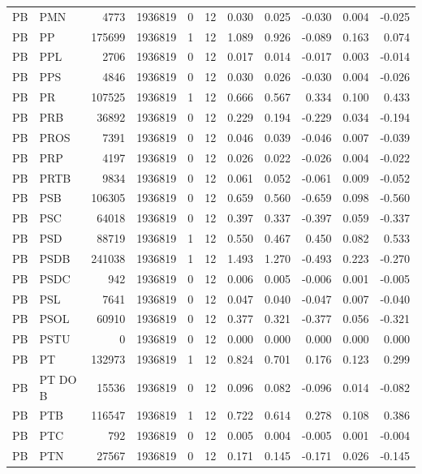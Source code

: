 \begin{landscape}
\begin{longtable}{llrrrrrrrrr}
PB & PMN & 4773 & 1936819 & 0 & 12 & 0.030 & 0.025 & -0.030 & 0.004 & -0.025 \\
PB & PP & 175699 & 1936819 & 1 & 12 & 1.089 & 0.926 & -0.089 & 0.163 & 0.074 \\
PB & PPL & 2706 & 1936819 & 0 & 12 & 0.017 & 0.014 & -0.017 & 0.003 & -0.014 \\
PB & PPS & 4846 & 1936819 & 0 & 12 & 0.030 & 0.026 & -0.030 & 0.004 & -0.026 \\
PB & PR & 107525 & 1936819 & 1 & 12 & 0.666 & 0.567 & 0.334 & 0.100 & 0.433 \\
PB & PRB & 36892 & 1936819 & 0 & 12 & 0.229 & 0.194 & -0.229 & 0.034 & -0.194 \\
PB & PROS & 7391 & 1936819 & 0 & 12 & 0.046 & 0.039 & -0.046 & 0.007 & -0.039 \\
PB & PRP & 4197 & 1936819 & 0 & 12 & 0.026 & 0.022 & -0.026 & 0.004 & -0.022 \\
PB & PRTB & 9834 & 1936819 & 0 & 12 & 0.061 & 0.052 & -0.061 & 0.009 & -0.052 \\
PB & PSB & 106305 & 1936819 & 0 & 12 & 0.659 & 0.560 & -0.659 & 0.098 & -0.560 \\
PB & PSC & 64018 & 1936819 & 0 & 12 & 0.397 & 0.337 & -0.397 & 0.059 & -0.337 \\
PB & PSD & 88719 & 1936819 & 1 & 12 & 0.550 & 0.467 & 0.450 & 0.082 & 0.533 \\
PB & PSDB & 241038 & 1936819 & 1 & 12 & 1.493 & 1.270 & -0.493 & 0.223 & -0.270 \\
PB & PSDC & 942 & 1936819 & 0 & 12 & 0.006 & 0.005 & -0.006 & 0.001 & -0.005 \\
PB & PSL & 7641 & 1936819 & 0 & 12 & 0.047 & 0.040 & -0.047 & 0.007 & -0.040 \\
PB & PSOL & 60910 & 1936819 & 0 & 12 & 0.377 & 0.321 & -0.377 & 0.056 & -0.321 \\
PB & PSTU & 0 & 1936819 & 0 & 12 & 0.000 & 0.000 & 0.000 & 0.000 & 0.000 \\
PB & PT & 132973 & 1936819 & 1 & 12 & 0.824 & 0.701 & 0.176 & 0.123 & 0.299 \\
PB & PT DO B & 15536 & 1936819 & 0 & 12 & 0.096 & 0.082 & -0.096 & 0.014 & -0.082 \\
PB & PTB & 116547 & 1936819 & 1 & 12 & 0.722 & 0.614 & 0.278 & 0.108 & 0.386 \\
PB & PTC & 792 & 1936819 & 0 & 12 & 0.005 & 0.004 & -0.005 & 0.001 & -0.004 \\
PB & PTN & 27567 & 1936819 & 0 & 12 & 0.171 & 0.145 & -0.171 & 0.026 & -0.145 \\

\end{longtable}
\end{landscape}
